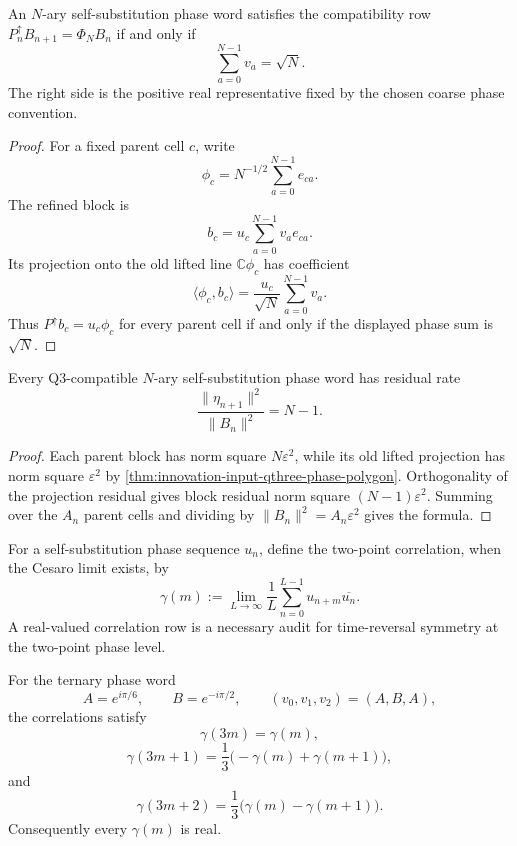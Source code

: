 \begin{theorem}
\label{thm:innovation-input-qthree-phase-polygon}
An $N$-ary self-substitution phase word satisfies the compatibility row
$P_n^\uparrow B_{n+1}=\Phi_NB_n$ if and only if
$$
\sum_{a=0}^{N-1}v_a=\sqrt N.
$$
The right side is the positive real representative fixed by the chosen
coarse phase convention.
\end{theorem}

\begin{proof}
For a fixed parent cell $c$, write
$$
\phi_c=N^{-1/2}\sum_{a=0}^{N-1}e_{ca}.
$$
The refined block is
$$
b_c=u_c\sum_{a=0}^{N-1}v_a e_{ca}.
$$
Its projection onto the old lifted line $\mathbb C\phi_c$ has coefficient
$$
\langle \phi_c,b_c\rangle
=
\frac{u_c}{\sqrt N}\sum_{a=0}^{N-1}v_a.
$$
Thus $P^\uparrow b_c=u_c\phi_c$ for every parent cell if and only if the
displayed phase sum is $\sqrt N$.
\end{proof}

\begin{corollary}
\label{cor:innovation-input-self-substitution-residual-rate}
Every Q3-compatible $N$-ary self-substitution phase word has residual rate
$$
\frac{\|\eta_{n+1}\|^2}{\|B_n\|^2}=N-1.
$$
\end{corollary}

\begin{proof}
Each parent block has norm square $N\varepsilon^2$, while its old lifted
projection has norm square $\varepsilon^2$ by
\autoref{thm:innovation-input-qthree-phase-polygon}. Orthogonality of the
projection residual gives block residual norm square
$(N-1)\varepsilon^2$. Summing over the $A_n$ parent cells and dividing by
$\|B_n\|^2=A_n\varepsilon^2$ gives the formula.
\end{proof}

\begin{definition}
\label{def:innovation-input-phase-correlation-row}
For a self-substitution phase sequence $u_n$, define the two-point
correlation, when the Cesaro limit exists, by
$$
\gamma(m)
:=
\lim_{L\to\infty}
\frac1L
\sum_{n=0}^{L-1}
u_{n+m}\overline{u_n}.
$$
A real-valued correlation row is a necessary audit for time-reversal
symmetry at the two-point phase level.
\end{definition}

\begin{theorem}
\label{thm:innovation-input-ternary-real-correlation-recursion}
For the ternary phase word
$$
A=e^{i\pi/6},
\qquad
B=e^{-i\pi/2},
\qquad
(v_0,v_1,v_2)=(A,B,A),
$$
the correlations satisfy
$$
\gamma(3m)=\gamma(m),
$$
$$
\gamma(3m+1)=\frac13\bigl(-\gamma(m)+\gamma(m+1)\bigr),
$$
and
$$
\gamma(3m+2)=\frac13\bigl(\gamma(m)-\gamma(m+1)\bigr).
$$
Consequently every $\gamma(m)$ is real.
\end{theorem}

